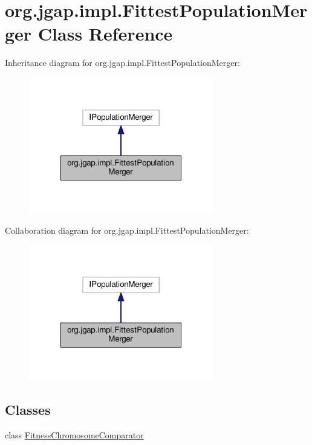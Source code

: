 \hypertarget{classorg_1_1jgap_1_1impl_1_1_fittest_population_merger}{\section{org.\-jgap.\-impl.\-Fittest\-Population\-Merger Class Reference}
\label{classorg_1_1jgap_1_1impl_1_1_fittest_population_merger}
}


Inheritance diagram for org.\-jgap.\-impl.\-Fittest\-Population\-Merger\-:
\nopagebreak
\begin{figure}[H]
\begin{center}
\leavevmode
\includegraphics[width=228pt]{classorg_1_1jgap_1_1impl_1_1_fittest_population_merger__inherit__graph}
\end{center}
\end{figure}


Collaboration diagram for org.\-jgap.\-impl.\-Fittest\-Population\-Merger\-:
\nopagebreak
\begin{figure}[H]
\begin{center}
\leavevmode
\includegraphics[width=228pt]{classorg_1_1jgap_1_1impl_1_1_fittest_population_merger__coll__graph}
\end{center}
\end{figure}
\subsection*{Classes}
\begin{DoxyCompactItemize}
\item 
class \hyperlink{classorg_1_1jgap_1_1impl_1_1_fittest_population_merger_1_1_fitness_chromosome_comparator}{Fitness\-Chromosome\-Comparator}
\end{DoxyCompactItemize}
